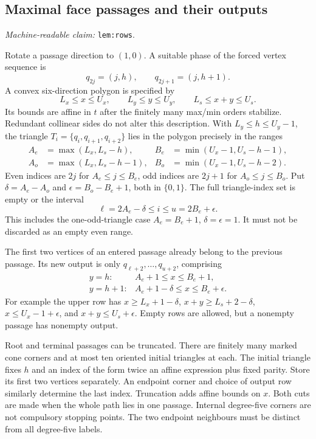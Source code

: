 \documentclass[11pt]{amsart}
\newcommand{\record}[1]{\nolinkurl{#1}}
\newcommand{\claimid}[1]{\par\nopagebreak\noindent\textit{Machine-readable claim:} \record{#1}.\par}
\theoremstyle{definition}\newtheorem{definition}{Definition}
\begin{document}
\subsection{Maximal face passages and their outputs}\label{lem:rows}
\claimid{lem:rows}
Rotate a passage direction to $(1,0)$. A suitable phase of the forced
vertex sequence is
\begin{equation}\label{eq:rows}
 q_{2j}=(j,h),\qquad q_{2j+1}=(j,h+1).
\end{equation}
A convex six-direction polygon is specified by
\[
 L_x\le x\le U_x,\qquad L_y\le y\le U_y,\qquad
 L_s\le x+y\le U_s.
\]
Its bounds are affine in $t$ after the finitely many max/min orders
stabilize. Redundant collinear sides do not alter this description.
With $L_y\le h\le U_y-1$, the triangle
$T_i=\{q_i,q_{i+1},q_{i+2}\}$ lies in the polygon precisely in the ranges
\begin{equation}\label{eq:triangle-bounds}
\begin{aligned}
 A_e&=\max(L_x,L_s-h),& B_e&=\min(U_x-1,U_s-h-1),\\
 A_o&=\max(L_x,L_s-h-1),& B_o&=\min(U_x-1,U_s-h-2).
\end{aligned}
\end{equation}
Even indices are $2j$ for $A_e\le j\le B_e$, odd indices are $2j+1$
for $A_o\le j\le B_o$. Put $\delta=A_e-A_o$ and
$\epsilon=B_o-B_e+1$, both in $\{0,1\}$. The full triangle-index set
is empty or the interval
\begin{equation}\label{eq:passage}
 \ell=2A_e-\delta\le i\le u=2B_e+\epsilon.
\end{equation}
This includes the one-odd-triangle case $A_e=B_e+1$,
$\delta=\epsilon=1$. It must not be discarded as an empty even range.

The first two vertices of an entered passage already belong to the
previous passage. Its new output is only
$q_{\ell+2},\ldots,q_{u+2}$, comprising
\begin{equation}\label{eq:output}
\begin{array}{ll}
 y=h:   &A_e+1\le x\le B_e+1,\\
 y=h+1: &A_e+1-\delta\le x\le B_e+\epsilon.
\end{array}
\end{equation}
For example the upper row has
$x\ge L_x+1-\delta$, $x+y\ge L_s+2-\delta$,
$x\le U_x-1+\epsilon$, and $x+y\le U_s+\epsilon$.
Empty rows are allowed, but a nonempty passage has nonempty output.

Root and terminal passages can be truncated. There are finitely many
marked cone corners and at most ten oriented initial triangles at each.
The initial triangle fixes $h$ and an index of the form twice an affine
expression plus fixed parity. Store its first two vertices separately.
An endpoint corner and choice of output row similarly determine the
last index. Truncation adds affine bounds on $x$. Both cuts are made
when the whole path lies in one passage. Internal degree-five corners
are not compulsory stopping points. The two endpoint neighbours must
be distinct from all degree-five labels.
\end{document}
